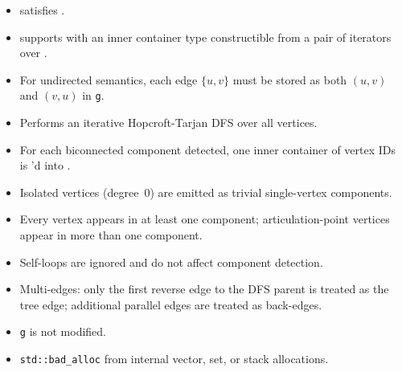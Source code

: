 {\small
     
}

\begin{itemdescr}
      \pnum\mandates
            \begin{itemize}
                  \item {} satisfies .
                  \item {} supports  with an inner container
                        type constructible from a pair of iterators over .
            \end{itemize}
      \pnum\preconditions
            \begin{itemize}
                  \item For undirected semantics, each edge $\{u,v\}$ must be stored as both $(u,v)$
                        and $(v,u)$ in \lstinline{g}.
            \end{itemize}
      \pnum\effects
            \begin{itemize}
                  \item Performs an iterative Hopcroft-Tarjan DFS over all vertices.
                  \item For each biconnected component detected, one inner container of vertex IDs
                        is 'd into .
                  \item Isolated vertices (degree~0) are emitted as trivial single-vertex components.
                  \item Every vertex appears in at least one component; articulation-point vertices
                        appear in more than one component.
                  \item Self-loops are ignored and do not affect component detection.
                  \item Multi-edges: only the first reverse edge to the DFS parent is treated as
                        the tree edge; additional parallel edges are treated as back-edges.
                  \item \lstinline{g} is not modified.
            \end{itemize}
      \pnum\throws
            \begin{itemize}
                  \item \lstinline{std::bad_alloc} from internal vector, set, or stack allocations.

\end{itemize}
\end{itemdescr}
